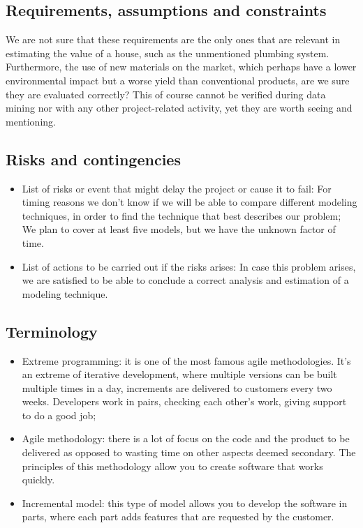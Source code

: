 \subsection{Requirements, assumptions and constraints}
We are not sure that these requirements are the only ones that are relevant in estimating the value of a house, such as the unmentioned plumbing system. Furthermore, the use of new materials on the market, which perhaps have a lower environmental impact but a worse yield than conventional products, are we sure they are evaluated correctly? This of course cannot be verified during data mining nor with any other project-related activity, yet they are worth seeing and mentioning.

\subsection{Risks and contingencies}
\begin{itemize}
\item List of risks or event that might delay the project or cause it to fail: For timing reasons we don't know if we will be able to compare different modeling techniques, in order to find the technique that best describes our problem; We plan to cover at least five models, but we have the unknown factor of time.
\item List of actions to be carried out if the risks arises: In case this problem arises, we are satisfied to be able to conclude a correct analysis and estimation of a modeling technique.
\end{itemize}	

\subsection{Terminology}
\begin{itemize}
    \item Extreme programming: it is one of the most famous agile methodologies. It's an extreme of iterative development, where multiple versions can be built multiple times in a day, increments are delivered to customers every two weeks. Developers work in pairs, checking each other's work, giving support to do a good job; 
    \item Agile methodology: there is a lot of focus on the code and the product to be delivered as opposed to wasting time on other aspects deemed secondary. The principles of this methodology allow you to create software that works quickly.
    \item Incremental model: this type of model allows you to develop the software in parts, where each part adds features that are requested by the customer.
\end{itemize}

